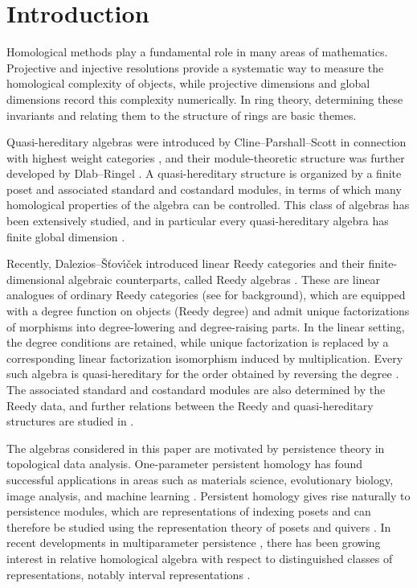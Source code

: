 \section{Introduction}
\label{sec:introduction}


Homological methods play a fundamental role in many areas of mathematics.
Projective and injective resolutions provide a systematic way to measure
the homological complexity of objects, while projective dimensions and
global dimensions record this complexity numerically.  In ring theory,
determining these invariants and relating them to the structure of rings
are basic themes.


Quasi-hereditary algebras were introduced by
Cline--Parshall--Scott in connection with highest weight categories
\cite{CPS}, and their module-theoretic structure was further developed by
Dlab--Ringel \cite{DR89}.  
A quasi-hereditary structure is organized by a finite poset and associated
standard and costandard modules, in terms of which many homological
properties of the algebra can be controlled.  This class of algebras has
been extensively studied, and in particular every quasi-hereditary algebra has finite global dimension \cite{DR90,DR92,Krause17}.


Recently, Dalezios--\v{S}\v{t}ov\'{\i}\v{c}ek introduced linear Reedy
categories and their finite-dimensional algebraic counterparts, called
Reedy algebras \cite{DS}.  These are linear analogues of ordinary Reedy
categories (see \cite[Section~5.2]{Hovey} for background), which are
equipped with a degree function on objects (Reedy degree) and admit unique
factorizations of morphisms into degree-lowering and degree-raising parts.
In the linear setting, the degree conditions are retained, while unique
factorization is replaced by a corresponding linear factorization isomorphism induced by multiplication.  
Every such algebra is quasi-hereditary for the order obtained
by reversing the degree \cite[Theorem~4.22]{DS}.  
The associated standard and costandard modules are also determined by the Reedy data, and further relations between the Reedy and quasi-hereditary
structures are studied in \cite{CDK}.


The algebras considered in this paper are motivated by persistence theory in topological data analysis.
One-parameter persistent homology
\cite{ELZ02,ZC05} has found successful applications in areas such as
materials science, evolutionary biology, image analysis, and machine learning \cite{HBH+16,CCR13,CBO+22,AEK+17}.
Persistent homology gives rise naturally to persistence modules, which are representations of indexing posets and can therefore be studied using the representation theory of posets and quivers \cite{ZC05,CZ09,Oudot15,EH}.
In recent developments in multiparameter persistence \cite{BL23}, there has been
growing interest in relative homological algebra with respect to
distinguished classes of representations, notably interval representations
\cite{BOO25,BOOS24,AENY,BBH24,BBH25,CGRST,Asashiba25,AET,ABH26}.

